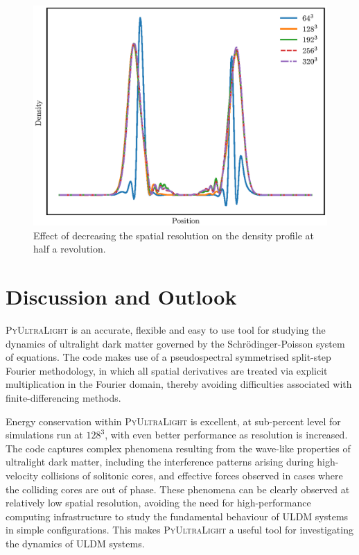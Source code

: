 \documentclass[a4paper,11pt]{article}
\newcommand{\PyUltraLight}{\textsc{PyUltraLight}\xspace}
\begin{document}
\begin{figure}
  \includegraphics[width=1.\textwidth,trim=0 0.8cm 0 1.2cm,clip]{comparison2}
  \caption{Effect of decreasing the spatial resolution on the density profile at half a revolution.}
  \label{fig:comparison2}
\end{figure}


\section{Discussion and Outlook}

\PyUltraLight is an accurate, flexible and easy to use tool for  studying the dynamics of ultralight dark matter governed by the Schr{\"o}dinger-Poisson system of equations. The code makes use of a pseudospectral symmetrised split-step Fourier methodology, in which all spatial derivatives are treated via explicit multiplication in the Fourier domain, thereby avoiding difficulties associated with finite-differencing methods. 

Energy conservation within \PyUltraLight is excellent, at sub-percent level for simulations run at $128^3$, with even better performance as resolution is increased. The code captures complex phenomena resulting from the wave-like properties of ultralight dark matter, including the interference patterns arising during high-velocity collisions of solitonic cores, and  effective forces observed in cases where the colliding cores are out of phase. These phenomena can be clearly observed at relatively low spatial resolution, avoiding the need for high-performance computing infrastructure to study the fundamental behaviour of ULDM systems in simple configurations. This makes \PyUltraLight a useful tool for investigating the  dynamics of ULDM systems. 
\end{document}
